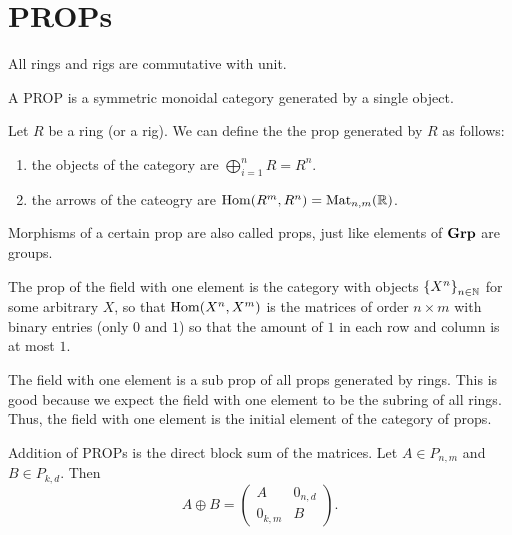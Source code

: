 \documentclass[11pt,a4paper]{article}
\begin{document}
\maketitle


\newpage
\tableofcontents
\newpage

\section{PROPs}
\begin{remark}
  All rings and rigs are commutative with unit.
\end{remark}

\begin{definition}[PROP]
  A PROP is a symmetric monoidal category generated by a single object.
\end{definition}

\begin{example}
  Let $R$ be a ring (or a rig).
  We can define the the prop generated by $R$ as follows:
  \begin{enumerate}
    \item[(1)] the objects of the category are $\bigoplus_{i=1}^{n} R = R^n$.
    \item[(2)] the arrows of the cateogry are $\operatorname{Hom}(R^m,R^n) = \operatorname{Mat}_{n,m}(\mathbb{R})$.
  \end{enumerate}
  Morphisms of a certain prop are also called props,
  just like elements of $\mathbf{Grp}$ are groups.
\end{example}

\begin{example}
  The prop of the field with one element is the category with objects
  $\left\{X^n\right\}_{n \in \mathbb{N}}$ for some arbitrary $X$,
  so that $\operatorname{Hom}(X^n,X^m)$ is the matrices of order $n \times m$
  with binary entries (only $0$ and $1$) so that the amount of $1$
  in each row and column is at most $1$.
\end{example}

\begin{remark}
  The field with one element is a sub prop of all props generated by rings.
  This is good because we expect the field with one element to be the subring
  of all rings.
  Thus, the field with one element is the initial element of the category
  of props.
\end{remark}

\begin{definition}
  Addition of PROPs is the direct block sum of the matrices.
  Let $A \in P_{n,m}$ and $B \in P_{k,d}$.
  Then
  \[
    A \oplus B =
    \begin{pmatrix}
      A & 0_{n,d} \\
      0_{k,m} & B
    \end{pmatrix}.
  \]
\end{definition}
\end{document}
